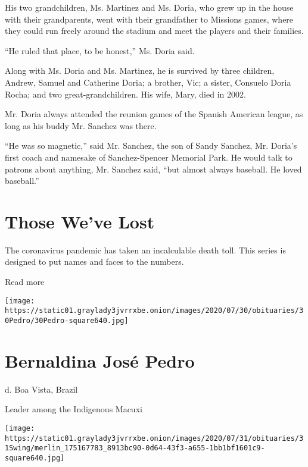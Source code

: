 His two grandchildren, Ms. Martinez and Ms. Doria, who grew up in the
house with their grandparents, went with their grandfather to Missions
games, where they could run freely around the stadium and meet the
players and their families.

``He ruled that place, to be honest,'' Ms. Doria said.

Along with Ms. Doria and Ms. Martinez, he is survived by three children,
Andrew, Samuel and Catherine Doria; a brother, Vic; a sister, Consuelo
Doria Rocha; and two great-grandchildren. His wife, Mary, died in 2002.

Mr. Doria always attended the reunion games of the Spanish American
league, as long as his buddy Mr. Sanchez was there.

``He was so magnetic,'' said Mr. Sanchez, the son of Sandy Sanchez, Mr.
Doria's first coach and namesake of Sanchez-Spencer Memorial Park. He
would talk to patrons about anything, Mr. Sanchez said, ``but almost
always baseball. He loved baseball.''

\href{https://www.nytimes3xbfgragh.onion/interactive/2020/obituaries/people-died-coronavirus-obituaries.html?action=click\&pgtype=Article\&state=default\&region=BELOW_MAIN_CONTENT\&context=covid_obits_promo}{}

\hypertarget{those-weve-lost}{%
\section{Those We've Lost}\label{those-weve-lost}}

The coronavirus pandemic has taken an incalculable death toll. This
series is designed to put names and faces to the numbers.

Read more

\texttt{[image: https://static01.graylady3jvrrxbe.onion/images/2020/07/30/obituaries/30Pedro/30Pedro-square640.jpg]}

\hypertarget{bernaldina-josuxe9-pedro}{%
\section{Bernaldina José Pedro}\label{bernaldina-josuxe9-pedro}}

d. Boa Vista, Brazil

Leader among the Indigenous Macuxi

\texttt{[image: https://static01.graylady3jvrrxbe.onion/images/2020/07/31/obituaries/31Swing/merlin\_175167783\_8913bc90-0d64-43f3-a655-1bb1bf1601c9-square640.jpg]}


